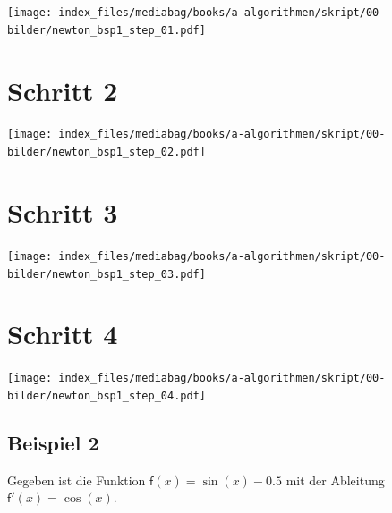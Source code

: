 \documentclass[
  letterpaper,
  DIV=11,
  numbers=noendperiod]{scrreprt}
\begin{document}
\texttt{[image: index\_files/mediabag/books/a-algorithmen/skript/00-bilder/newton\_bsp1\_step\_01.pdf]}

\section{Schritt 2}

\texttt{[image: index\_files/mediabag/books/a-algorithmen/skript/00-bilder/newton\_bsp1\_step\_02.pdf]}

\section{Schritt 3}

\texttt{[image: index\_files/mediabag/books/a-algorithmen/skript/00-bilder/newton\_bsp1\_step\_03.pdf]}

\section{Schritt 4}

\texttt{[image: index\_files/mediabag/books/a-algorithmen/skript/00-bilder/newton\_bsp1\_step\_04.pdf]}

\subsection{Beispiel 2}\label{beispiel-2}

Gegeben ist die Funktion \(\mathsf f(x) = \sin(x) - 0.5\) mit der
Ableitung \(\mathsf f'(x) = \cos(x)\).
\end{document}
